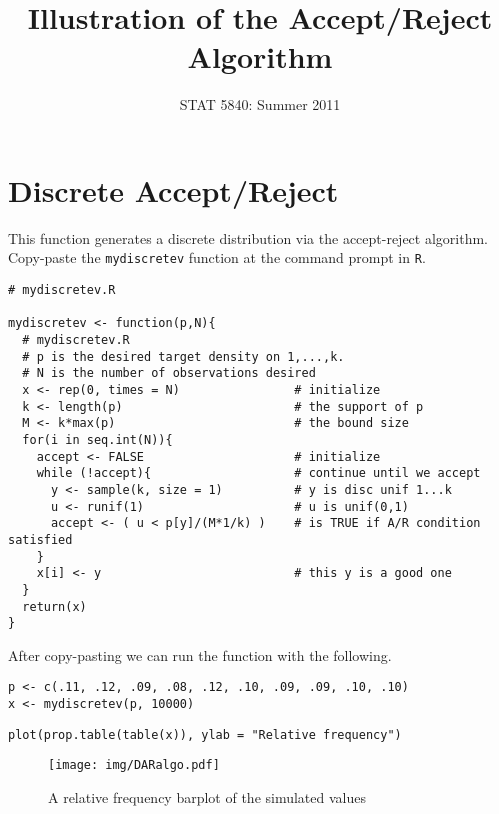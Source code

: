 \documentclass[11pt,english]{article}
\title{Illustration of the Accept/Reject Algorithm}
\date{STAT 5840: Summer 2011}
\begin{document}
\maketitle

\thispagestyle{empty}

\section*{Discrete Accept/Reject}
\label{sec-1}

This function generates a discrete distribution via the accept-reject algorithm.  Copy-paste the \texttt{mydiscretev} function at the command prompt in \texttt{R}.

\begin{verbatim}
# mydiscretev.R

mydiscretev <- function(p,N){
  # mydiscretev.R
  # p is the desired target density on 1,...,k.
  # N is the number of observations desired
  x <- rep(0, times = N)                # initialize
  k <- length(p)                        # the support of p
  M <- k*max(p)                         # the bound size
  for(i in seq.int(N)){
    accept <- FALSE                     # initialize
    while (!accept){                    # continue until we accept
      y <- sample(k, size = 1)          # y is disc unif 1...k
      u <- runif(1)                     # u is unif(0,1)
      accept <- ( u < p[y]/(M*1/k) )    # is TRUE if A/R condition satisfied
    }
    x[i] <- y                           # this y is a good one
  }
  return(x)
}
\end{verbatim}



After copy-pasting we can run the function with the following.

\begin{verbatim}
p <- c(.11, .12, .09, .08, .12, .10, .09, .09, .10, .10)
x <- mydiscretev(p, 10000)
\end{verbatim}






\begin{verbatim}
plot(prop.table(table(x)), ylab = "Relative frequency")
\end{verbatim}




\begin{figure}[h!]
\centering
\texttt{[image: img/DARalgo.pdf]}
\caption{\label{fig:yplot}A relative frequency barplot of the simulated values}
\end{figure}
\end{document}
